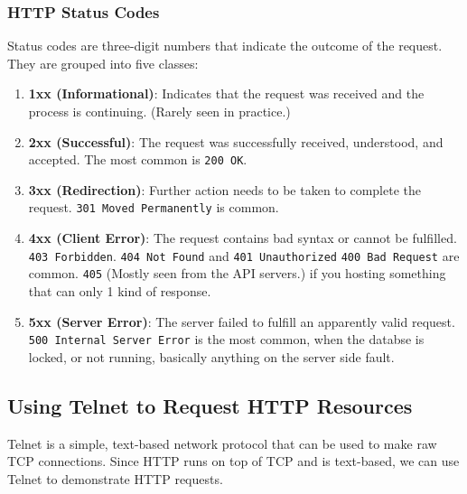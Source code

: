 \subsubsection{HTTP Status Codes}
Status codes are three-digit numbers that indicate the outcome of the request. They are grouped into five classes:
\begin{enumerate}
    \item \textbf{1xx (Informational)}: Indicates that the request was received and the process is continuing.  (Rarely seen in practice.)
    \item \textbf{2xx (Successful)}: The request was successfully received, understood, and accepted.  The most common is \texttt{200 OK}.
    \item \textbf{3xx (Redirection)}: Further action needs to be taken to complete the request.  \texttt{301 Moved Permanently} is common.
    \item \textbf{4xx (Client Error)}: The request contains bad syntax or cannot be fulfilled. \texttt{403 Forbidden}. \texttt{404 Not Found} and \texttt{401 Unauthorized} \texttt{400 Bad Request} are common. \texttt{405} (Mostly seen from the API servers.) if you hosting something that can only 1 kind of response.
    \item \textbf{5xx (Server Error)}: The server failed to fulfill an apparently valid request. \texttt{500 Internal Server Error} is the most common, when the databse is locked, or not running, basically anything on the server side fault.
\end{enumerate}


\subsection{Using Telnet to Request HTTP Resources}
Telnet is a simple, text-based network protocol that can be used to make raw TCP connections. Since HTTP runs on top of TCP and is text-based, we can use Telnet to demonstrate HTTP requests.


